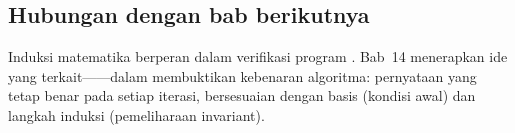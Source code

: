 \subsection{Hubungan dengan bab berikutnya}

Induksi matematika berperan dalam verifikasi program \cite{mit_6042}. Bab~14 menerapkan ide yang terkait------dalam membuktikan kebenaran algoritma: pernyataan yang tetap benar pada setiap iterasi, bersesuaian dengan basis (kondisi awal) dan langkah induksi (pemeliharaan invariant).
